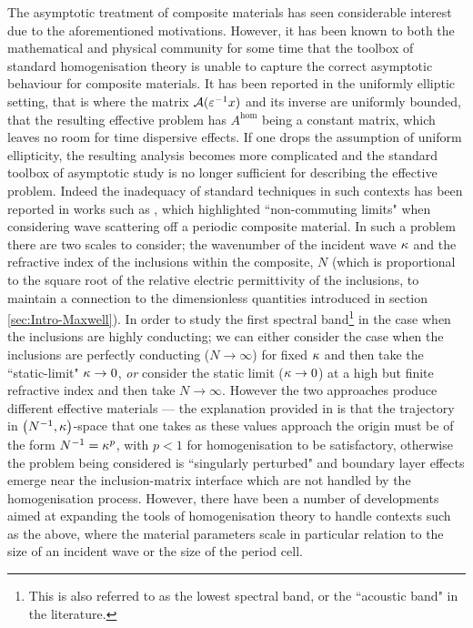 The asymptotic treatment of composite materials has seen considerable interest due to the aforementioned motivations.
However, it has been known to both the mathematical and physical community for some time that the toolbox of standard homogenisation theory is unable to capture the correct asymptotic behaviour for composite materials.
It has been reported  in the uniformly elliptic setting, that is where the matrix $\mathcal{A}(\varepsilon^{-1}x)$ and its inverse are uniformly bounded, that the resulting effective problem has $A^{\mathrm{hom}}$ being a constant matrix, which leaves no room for time dispersive effects.
If one drops the assumption of uniform ellipticity, the resulting analysis becomes more complicated and the standard toolbox of asymptotic study is no longer sufficient for describing the effective problem.
Indeed the inadequacy of standard techniques in such contexts has been reported in works such as \cite{nicorovici1995photonic} , which highlighted ``non-commuting limits" when considering wave scattering off a periodic composite material.
In such a problem there are two scales to consider; the wavenumber of the incident wave $\kappa$ and the refractive index of the inclusions within the composite, $N$ (which is proportional to the square root of the relative electric permittivity of the inclusions, to maintain a connection to the dimensionless quantities introduced in section \ref{sec:Intro-Maxwell}).
In order to study the first spectral band\footnote{This is also referred to as the lowest spectral band, or the ``acoustic band" in the literature.} in the case when the inclusions are highly conducting; we can either consider the case when the inclusions are perfectly conducting ($N\rightarrow\infty$) for fixed $\kappa$ and then take the ``static-limit" $\kappa\rightarrow0$, \emph{or} consider the static limit ($\kappa\rightarrow0$) at a high but finite refractive index and then take $N\rightarrow\infty$.
However the two approaches produce different effective materials --- the explanation provided in \cite{movchan2001noncommuting} is that the trajectory in $\left( N^{-1},\kappa \right)$-space that one takes as these values approach the origin must be of the form $N^{-1}=\kappa^p$, with $p<1$ for homogenisation to be satisfactory, otherwise the problem being considered is ``singularly perturbed" and boundary layer effects emerge near the inclusion-matrix interface which are not handled by the homogenisation process.
However, there have been a number of developments aimed at expanding the tools of homogenisation theory to handle contexts such as the above, where the material parameters scale in particular relation to the size of an incident wave or the size of the period cell.

